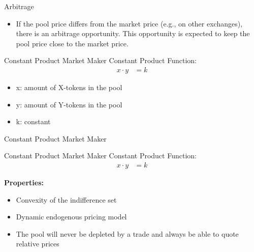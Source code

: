\documentclass[]{beamer}
\begin{document}
\begin{frame}{Arbitrage}
	\begin{figure}
		\begin{tikzpicture}
		
		\end{tikzpicture}
	\end{figure}
	\begin{itemize}
		\item If the pool price differs from the market price (e.g., on other exchanges), there is an arbitrage opportunity. This opportunity is expected to keep the pool price close to the market price.
	\end{itemize}	
\end{frame}


\begin{frame}{Constant Product Market Maker}
Constant Product Function:
	\begin{align*}
		x \cdot y &= k
	\end{align*}

	\begin{itemize}
		\item[] x: amount of X-tokens in the pool
		\item[] y: amount of Y-tokens in the pool
		\item[] k: constant
	\end{itemize}
	\vspace{1cm}
\end{frame}


\begin{frame}{Constant Product Market Maker}
	\begin{figure}[h!]
		\begin{center}
			
		\end{center}
	\end{figure}
\end{frame}


\begin{frame}{Constant Product Market Maker}
Constant Product Function:
	\begin{align*}
		x \cdot y &= k
	\end{align*}
	
	\textbf{Properties:}
	\begin{itemize}
		\item<1-> Convexity of the indifference set
		\item<2-> Dynamic endogenous pricing model
		\item<3-> The pool will never be depleted by a trade and always be able to quote relative prices
	\end{itemize}
\end{frame}
\end{document}
